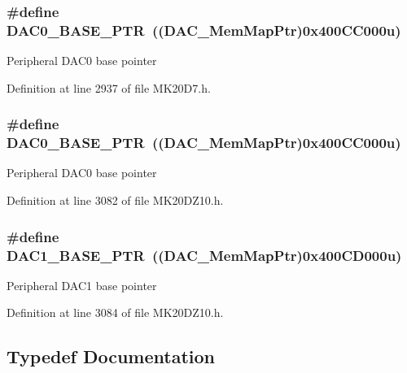 \subsubsection[{\texorpdfstring{D\+A\+C0\+\_\+\+B\+A\+S\+E\+\_\+\+P\+TR}{DAC0_BASE_PTR}}]{\setlength{\rightskip}{0pt plus 5cm}\#define D\+A\+C0\+\_\+\+B\+A\+S\+E\+\_\+\+P\+TR~(({\bf D\+A\+C\+\_\+\+Mem\+Map\+Ptr})0x400\+C\+C000u)}\hypertarget{group___d_a_c___peripheral_gabe3b30df06ec04e5c899efd6e49f1800}{}\label{group___d_a_c___peripheral_gabe3b30df06ec04e5c899efd6e49f1800}
Peripheral D\+A\+C0 base pointer 

Definition at line 2937 of file M\+K20\+D7.\+h.

\subsubsection[{\texorpdfstring{D\+A\+C0\+\_\+\+B\+A\+S\+E\+\_\+\+P\+TR}{DAC0_BASE_PTR}}]{\setlength{\rightskip}{0pt plus 5cm}\#define D\+A\+C0\+\_\+\+B\+A\+S\+E\+\_\+\+P\+TR~(({\bf D\+A\+C\+\_\+\+Mem\+Map\+Ptr})0x400\+C\+C000u)}\hypertarget{group___d_a_c___peripheral_gabe3b30df06ec04e5c899efd6e49f1800}{}\label{group___d_a_c___peripheral_gabe3b30df06ec04e5c899efd6e49f1800}
Peripheral D\+A\+C0 base pointer 

Definition at line 3082 of file M\+K20\+D\+Z10.\+h.

\subsubsection[{\texorpdfstring{D\+A\+C1\+\_\+\+B\+A\+S\+E\+\_\+\+P\+TR}{DAC1_BASE_PTR}}]{\setlength{\rightskip}{0pt plus 5cm}\#define D\+A\+C1\+\_\+\+B\+A\+S\+E\+\_\+\+P\+TR~(({\bf D\+A\+C\+\_\+\+Mem\+Map\+Ptr})0x400\+C\+D000u)}\hypertarget{group___d_a_c___peripheral_gab3af24d21edf756c3f794c52b5789847}{}\label{group___d_a_c___peripheral_gab3af24d21edf756c3f794c52b5789847}
Peripheral D\+A\+C1 base pointer 

Definition at line 3084 of file M\+K20\+D\+Z10.\+h.



\subsection{Typedef Documentation}
